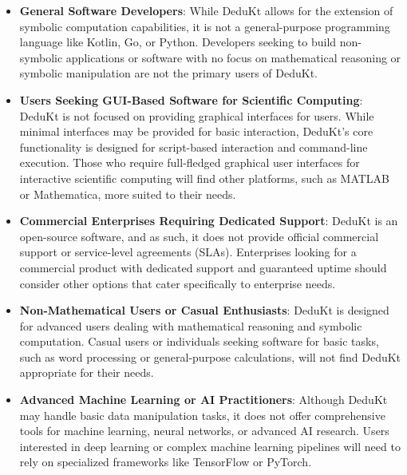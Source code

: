 \begin{itemize}
    \item \textbf{General Software Developers}: While DeduKt allows for the extension of symbolic computation capabilities, it is not a general-purpose programming language like Kotlin, Go, or Python.
Developers seeking to build non-symbolic applications or software with no focus on mathematical reasoning or symbolic manipulation are not the primary users of DeduKt.

    \item \textbf{Users Seeking GUI-Based Software for Scientific Computing}: DeduKt is not focused on providing graphical interfaces for users.
While minimal interfaces may be provided for basic interaction, DeduKt’s core functionality is designed for script-based interaction and command-line execution.
Those who require full-fledged graphical user interfaces for interactive scientific computing will find other platforms, such as MATLAB or Mathematica, more suited to their needs.

    \item \textbf{Commercial Enterprises Requiring Dedicated Support}: DeduKt is an open-source software, and as such, it does not provide official commercial support or service-level agreements (SLAs).
Enterprises looking for a commercial product with dedicated support and guaranteed uptime should consider other options that cater specifically to enterprise needs.

    \item \textbf{Non-Mathematical Users or Casual Enthusiasts}: DeduKt is designed for advanced users dealing with mathematical reasoning and symbolic computation.
Casual users or individuals seeking software for basic tasks, such as word processing or general-purpose calculations, will not find DeduKt appropriate for their needs.

    \item \textbf{Advanced Machine Learning or AI Practitioners}: Although DeduKt may handle basic data manipulation tasks, it does not offer comprehensive tools for machine learning, neural networks, or advanced AI research.
Users interested in deep learning or complex machine learning pipelines will need to rely on specialized frameworks like TensorFlow or PyTorch.
\end{itemize}
